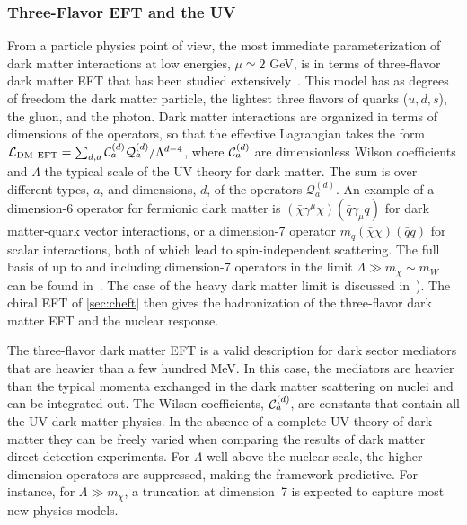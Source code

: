 \subsubsection{Three-Flavor EFT and the UV}\label{sec:quark-level}

From a particle physics point of view, the most immediate parameterization of dark matter interactions at low energies, $\mu\simeq 2$ GeV, is in terms of three-flavor dark matter EFT that has been studied extensively~\cite{Goodman:2010yf,Goodman:2010ku,Fox:2011pm,Crivellin:2014qxa,DEramo:2014nmf,Hill:2014yxa,Hill:2014yka,Bishara:2016hek,Bishara:2017pfq,Bishara:2017nnn,Brod:2017bsw,Hoferichter:2015ipa,Hoferichter:2016nvd,Hoferichter:2018acd}. This model has as degrees of freedom the dark matter particle, the lightest three flavors of quarks ($u,d,s$), the gluon, and the photon. Dark matter interactions are organized in terms of dimensions of the operators, so that the effective Lagrangian takes the form ${\cal L}_{\rm DM~EFT}= \sum_{d,a} {\cal C}_a^{(d)} {\mathcal Q}_a^{(d)} / \Lambda^{d-4} $, where ${\cal C}_a^{(d)}$ are dimensionless Wilson coefficients and $\Lambda$ the typical scale of the UV theory for dark matter. The sum is over different types, $a$, and dimensions, $d$, of the operators ${\mathcal Q}_a^{(d)}$. An example of a dimension-6 operator for fermionic dark matter is $(\bar \chi \gamma^\mu \chi)(\bar q\gamma_\mu q)$ for dark matter-quark vector interactions, or a dimension-7 operator $m_q(\bar \chi \chi)(\bar q q)$ for scalar interactions, both of which lead to spin-independent scattering. The full basis of up to and including dimension-7 operators in the limit $\Lambda \gg m_\chi \sim m_W$ can be found in~\cite{Brod:2017bsw}. The case of the heavy dark matter limit is discussed in~\cite{Hill:2011be,Hill:2014yka,Hill:2014yxa,Chen:2019gtm}). The chiral EFT of \autoref{sec:cheft} then gives the hadronization of the three-flavor dark matter EFT and the nuclear response.

The three-flavor dark matter EFT is a valid description for dark sector mediators that are heavier than a few hundred MeV. In this case, the mediators are heavier than the typical momenta exchanged in the dark matter scattering on nuclei and can be integrated out. The Wilson coefficients, ${\cal C}_a^{(d)}$, are constants that contain all the UV dark matter physics. In the absence of a complete UV theory of dark matter they can be freely varied when comparing the results of dark matter direct detection experiments. For $\Lambda$ well above the nuclear scale, the higher dimension operators are suppressed, making the framework predictive. For instance, for $\Lambda \gg m_\chi$,  a truncation at dimension~7 is expected to capture most new physics models.

